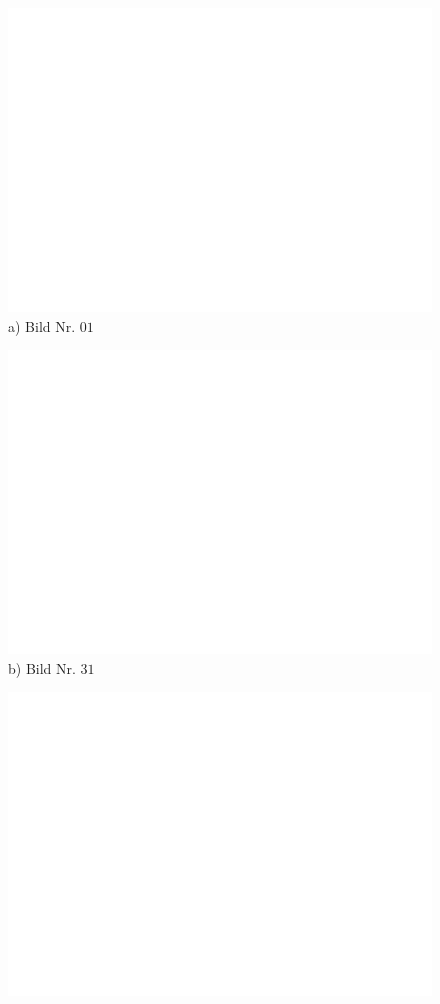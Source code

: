 \begin{figure}[H]
\centering
  \begin{minipage}{0.3\textwidth}
    \includegraphics[width=\textwidth]{images/dummy.png}
    a) Bild Nr. $01$
  \end{minipage}
  \begin{minipage}{0.3\textwidth}
    \includegraphics[width=\textwidth]{images/dummy.png}
    b) Bild Nr. $31$
  \end{minipage}
   \begin{minipage}{0.3\textwidth}
    \includegraphics[width=\textwidth]{images/dummy.png}

\end{minipage}
\end{figure}
